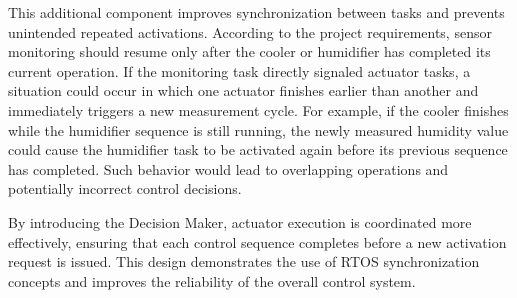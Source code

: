 This additional component improves synchronization between tasks and prevents unintended repeated activations.
According to the project requirements, sensor monitoring should resume only after the cooler or humidifier has
completed its current operation. If the monitoring task directly signaled actuator tasks, a situation could occur in
which one actuator finishes earlier than another and immediately triggers a new measurement cycle. For example, if the
cooler finishes while the humidifier sequence is still running, the newly measured humidity value could cause the
humidifier task to be activated again before its previous sequence has completed. Such behavior would lead to
overlapping operations and potentially incorrect control decisions.

By introducing the Decision Maker, actuator execution is coordinated more effectively, ensuring that each control
sequence completes before a new activation request is issued. This design demonstrates the use of RTOS synchronization
concepts and improves the reliability of the overall control system.


